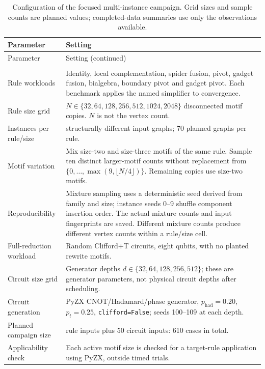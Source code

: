 \begin{longtable}{@{}>{\raggedright\arraybackslash}p{}>{\raggedright\arraybackslash}p{}@{}}
\caption{Configuration of the focused multi-instance campaign. Grid sizes and sample counts are planned values; completed-data summaries use only the observations available.}
\label{tab:experimental-setup}\\
\hline
Parameter & Setting \\
\hline
\endfirsthead
\hline
Parameter & Setting (continued) \\
\hline
\endhead
\hline
\endfoot
\multicolumn{2}{l}{\textbf{Workloads and input generation}} \\
Rule workloads & Identity, local complementation, spider fusion, pivot, gadget fusion, bialgebra, boundary pivot and gadget pivot. Each benchmark applies the named simplifier to convergence. \\
Rule size grid & $N\in\{32,64,128,256,512,1024,2048\}$ disconnected motif copies. $N$ is not the vertex count. \\
Instances per rule/size & 10 structurally different input graphs; 70 planned graphs per rule. \\
Motif variation & Mix size-two and size-three motifs of the same rule. Sample ten distinct larger-motif counts without replacement from $\{0,\ldots,\max(9,\lfloor N/4\rfloor)\}$. Remaining copies use size-two motifs. \\
Reproducibility & Mixture sampling uses a deterministic seed derived from family and size; instance seeds 0--9 shuffle component insertion order. The actual mixture counts and input fingerprints are saved. Different mixture counts produce different vertex counts within a rule/size cell. \\
Full-reduction workload & Random Clifford+T circuits, eight qubits, with no planted rewrite motifs. \\
Circuit size grid & Generator depths $d\in\{32,64,128,256,512\}$; these are generator parameters, not physical circuit depths after scheduling. \\
Circuit generation & PyZX CNOT/Hadamard/phase generator, $p_{\mathrm{had}}=0.20$, $p_t=0.25$, \texttt{clifford=False}; seeds 100--109 at each depth. \\
Planned campaign size & 560 rule inputs plus 50 circuit inputs: 610 cases in total. \\
Applicability check & Each active motif size is checked for a target-rule application using PyZX, outside timed trials. \\

\end{longtable}
